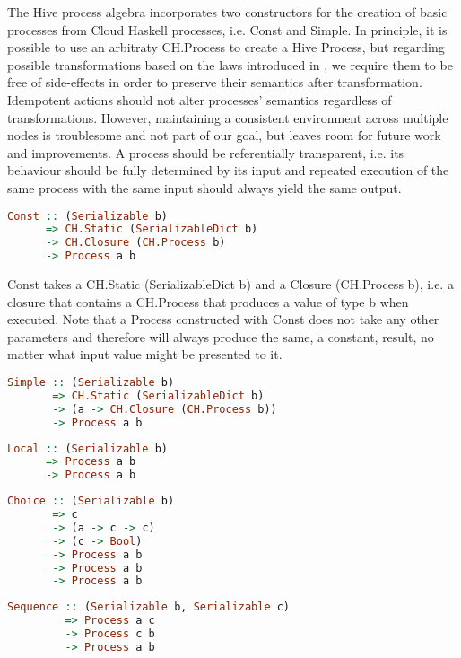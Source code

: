 The Hive process algebra incorporates two constructors for the creation of basic processes from Cloud Haskell processes, i.e. \textsf{Const} and \textsf{Simple}. In principle, it is possible to use an arbitraty \textsf{CH.Process} to create a Hive \textsf{Process}, but regarding possible transformations based on the laws introduced in , we require them to be free of side-effects in order to preserve their semantics after transformation. Idempotent actions should not alter processes' semantics regardless of transformations. However, maintaining a consistent environment across multiple nodes is troublesome and not part of our goal, but leaves room for future work and improvements. A process should be referentially transparent, i.e. its behaviour should be fully determined by its input and repeated execution of the same process with the same input should always yield the same output.
\begin{lstlisting}[language=Haskell]
Const :: (Serializable b) 
      => CH.Static (SerializableDict b)
      -> CH.Closure (CH.Process b)
      -> Process a b
\end{lstlisting}
\textsf{Const} takes a \textsf{CH.Static (SerializableDict b)} and a \textsf{Closure (CH.Process b)}, i.e. a closure that contains a \textsf{CH.Process} that produces a value of type \textsf{b} when executed. Note that a \textsf{Process} constructed with \textsf{Const} does not take any other parameters and therefore will always produce the same, a constant, result, no matter what input value might be presented to it. 

\begin{lstlisting}[language=Haskell]
Simple :: (Serializable b) 
       => CH.Static (SerializableDict b)
       -> (a -> CH.Closure (CH.Process b))
       -> Process a b
\end{lstlisting}


\begin{lstlisting}[language=Haskell]
Local :: (Serializable b) 
      => Process a b
      -> Process a b
\end{lstlisting}

\begin{lstlisting}[language=Haskell]
Choice :: (Serializable b)
       => c
       -> (a -> c -> c)
       -> (c -> Bool)
       -> Process a b
       -> Process a b
       -> Process a b
\end{lstlisting}

\begin{lstlisting}[language=Haskell]
Sequence :: (Serializable b, Serializable c)
         => Process a c
         -> Process c b
         -> Process a b
\end{lstlisting}

